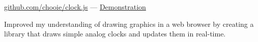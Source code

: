 \href{https://github.com/chooie/clock.js} {github.com/chooie/clock.js} ---
\href {https://chooie.github.io/clock.js} {Demonstration}

\begin{itemize}
  {\small
  \item Improved my understanding of drawing graphics in a web browser by
    creating a library that draws simple analog clocks and updates them in
    real-time.
  }
\end{itemize}

